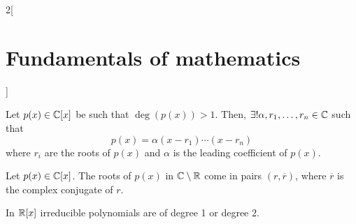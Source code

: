 \documentclass[../../../main.tex]{subfiles}
\begin{document}
\begin{multicols}{2}[\section{Fundamentals of mathematics}]
\begin{theorem}
  \end{theorem}
  \begin{corollary}
    Let $p(x)\in\mathbb{C}[x]$ be such that $\deg(p(x))>1$. Then, $\exists!\alpha,r_1,\ldots,r_n\in\mathbb{C}$ such that $$p(x)=\alpha(x-r_1)\cdots(x-r_n)$$ where $r_i$ are the roots of $p(x)$ and $\alpha$ is the leading coefficient of $p(x)$.
  \end{corollary}
  \begin{corollary}
    Let $p(x)\in\mathbb{C}[x]$. The roots of $p(x)$ in $\mathbb{C}\setminus\mathbb{R}$ come in pairs $(r,\overline{r})$, where $\overline{r}$ is the complex conjugate of $r$.
  \end{corollary}
  \begin{theorem}
    In $\mathbb{R}[x]$ irreducible polynomials are of degree 1 or degree 2.
  \end{theorem}
\end{multicols}
\end{document}
